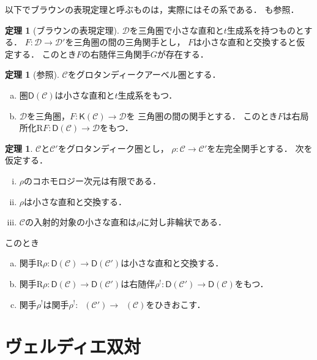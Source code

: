 \documentclass[uplatex,dvipdfmx,a4paper,10pt,draft]{jsarticle}
\theoremstyle{definition}
\newcommand{\mcal}{\mathcal}
\numberwithin{equation}{section}
\newcommand{\cC}{\mcal{C}}
\newcommand{\cD}{\mcal{D}}
\newcommand{\Komp}{\mathsf{K}}
\newcommand{\Domp}{\mathsf{D}}
\newcommand{\Dompl}{\mathop{\mathsf{D}^\mathrm{+}}\nolimits}
\newcommand{\Rdf}{\mathrm{R}}
\theoremstyle{mystyle}
\newtheorem{THM}[AXM]{定理}
\begin{document}
以下でブラウンの表現定理と呼ぶものは，実際にはその系である．
\cite[Cor. 10.5.3]{KS06}も参照．

\begin{THM}[ブラウンの表現定理]
    \(\cD\)を三角圏で小さな直和と\(t\)生成系を持つものとする．
    \(F\colon\cD\to\cD'\)を三角圏の間の三角関手とし，
    \(F\)は小さな直和と交換すると仮定する．
    このとき\(F\)の右随伴三角関手\(G\)が存在する．
\end{THM}

\begin{THM}[{\cite[Th. 14.3.1]{KS06}参照}]
    \(\cC\)をグロタンディークアーベル圏とする．
    \begin{enumerate}[(a)]
        \item 圏\(\Domp(\cC)\)は小さな直和と\(t\)生成系をもつ．
        \item \(\cD\)を三角圏，\(F\colon\Komp(\cC)\to\cD\)を
        三角圏の間の関手とする．
        このとき\(F\)は右局所化\(
            \Rdf{F}\colon \Domp(\cC)\to\cD
        \)をもつ．
    \end{enumerate}
\end{THM}

\begin{THM}\label{757}
    \(\cC\)と\(\cC'\)をグロタンディーク圏とし，
    \(\rho\colon\cC\to\cC'\)を左完全関手とする．
    次を仮定する．
    \begin{enumerate}[(i)]
        \item \(\rho\)のコホモロジー次元は有限である．\label{757-11}
        \item \(\rho\)は小さな直和と交換する．\label{757-12}
        \item \(\cC\)の入射的対象の小さな直和は\(\rho\)に対し非輪状である．\label{757-13}
    \end{enumerate}
    このとき
    \begin{enumerate}[(a)]
        \item 関手\(\Rdf{\rho}\colon\Domp(\cC)\to\Domp(\cC')\)は小さな直和と交換する．\label{757-21}
        \item 関手\(\Rdf{\rho}\colon\Domp(\cC)\to\Domp(\cC')\)は右随伴\(\rho^{!}\colon\Domp(\cC')\to\Domp(\cC)\)をもつ．\label{757-22}
        \item 関手\(\rho^{!}\)は関手\(\rho^{!}\colon\Dompl(\cC')\to\Dompl(\cC)\)をひきおこす．\label{757-23}
    \end{enumerate}
\end{THM}


\section{ヴェルディエ双対}
\end{document}
